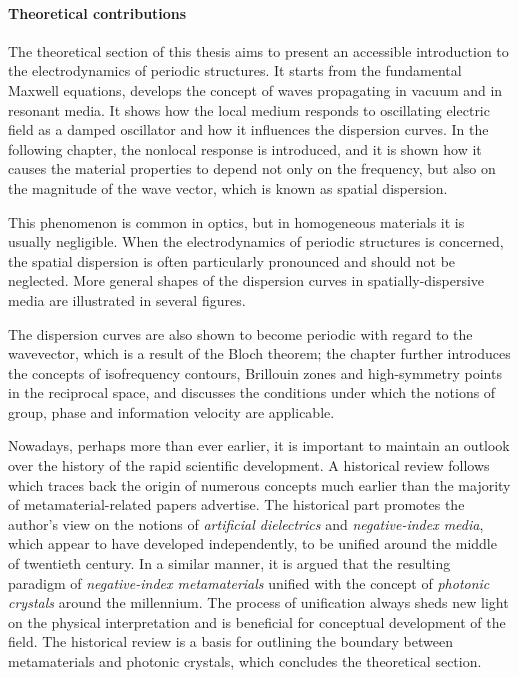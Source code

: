 \paragraph{Theoretical contributions}
The theoretical section of this thesis aims to present an accessible introduction to the electrodynamics of periodic structures. It starts from the fundamental Maxwell equations, develops the concept of waves propagating in vacuum and in resonant media. It shows how the local medium responds to oscillating electric field as a damped oscillator and how it influences the dispersion curves. In the following chapter, the nonlocal response is introduced, and it is shown how it causes the material properties to depend not only on the frequency, but also on the magnitude of the wave vector, which is known as spatial dispersion. 

This phenomenon is common in optics, but in homogeneous materials it is usually negligible. When the electrodynamics of periodic structures is concerned, the spatial dispersion is often particularly pronounced and should not be neglected. More general shapes of the dispersion curves in spatially-dispersive media are illustrated in several figures. 

The dispersion curves are also shown to become periodic with regard to the wavevector, which is a result of the Bloch theorem; the chapter further introduces the concepts of isofrequency contours, Brillouin zones and high-symmetry points in the reciprocal space, and discusses the conditions under which the notions of group, phase and information velocity are applicable.

Nowadays, perhaps more than ever earlier, it is important to maintain an outlook over the history of the rapid scientific development. A  historical review follows which traces back the origin of numerous concepts much earlier than the majority of metamaterial-related papers advertise. %
The historical part promotes the author's view on the notions of \textit{artificial dielectrics} and \textit{negative-index media}, which appear to have developed independently, to be unified around the middle of twentieth century. In a similar manner, it is argued that the resulting paradigm of \textit{negative-index metamaterials} unified with the concept of \textit{photonic crystals} around the millennium. The process of unification always sheds new light on the physical interpretation and is beneficial for conceptual development of the field. The historical review is a basis for outlining the boundary between metamaterials and photonic crystals, which concludes the theoretical section.

